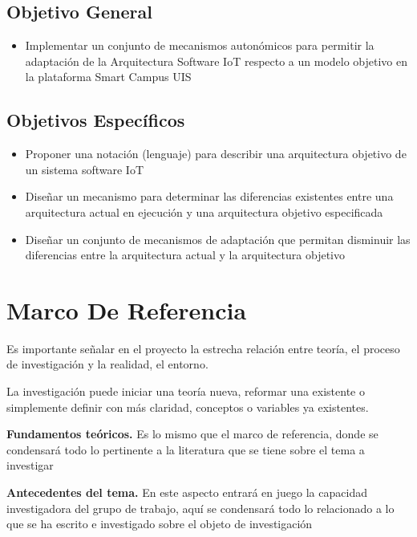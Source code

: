 \documentclass[12pt]{article}
\begin{document}
    \subsection{Objetivo General}
    \begin{itemize}

        \item Implementar un conjunto de mecanismos autonómicos para permitir la adaptación de la Arquitectura Software IoT respecto a un modelo objetivo en la plataforma Smart Campus UIS

    \end{itemize}

    \subsection{Objetivos Específicos}

    \begin{itemize}
        \item Proponer una notación (lenguaje) para describir una arquitectura objetivo de un sistema software IoT
        \item Diseñar un mecanismo para determinar las diferencias existentes entre una arquitectura actual en ejecución y una arquitectura objetivo especificada
        \item Diseñar un conjunto de mecanismos de adaptación que permitan disminuir las diferencias entre la arquitectura actual y la arquitectura objetivo

    \end{itemize}

    \section{Marco De Referencia}

    Es importante señalar en el proyecto la estrecha relación entre teoría, el proceso de investigación y la realidad, el entorno. 

    La investigación puede iniciar una teoría nueva, reformar una existente o simplemente definir con más claridad, conceptos o variables ya existentes.

    \textbf{Fundamentos teóricos.} Es lo mismo que el marco de referencia, donde se condensará todo lo pertinente a la literatura que se tiene sobre el tema a investigar
    
    \textbf{Antecedentes del tema.}  En este aspecto entrará en juego la capacidad investigadora del grupo de trabajo, aquí se condensará todo lo relacionado a lo que se ha escrito e investigado sobre el objeto de investigación
\end{document}
